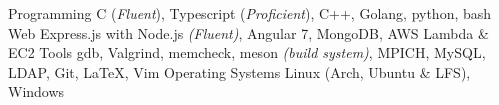 \begin{cvskills}
	\cvskill
		{Programming}
        {C (\textit{Fluent}), Typescript (\textit{Proficient}), C++, Golang, python, bash}
	\cvskill
		{Web}
		{Express.js with Node.js \textit{(Fluent)}, Angular 7, MongoDB, AWS Lambda \& EC2}
	\cvskill
	{Tools}
        {gdb, Valgrind, memcheck, meson \textit{(build system)}, MPICH, MySQL, LDAP, Git, \LaTeX, Vim}
	\cvskill
		{Operating Systems}
		{Linux (Arch, Ubuntu \& LFS), Windows}
\end{cvskills}


